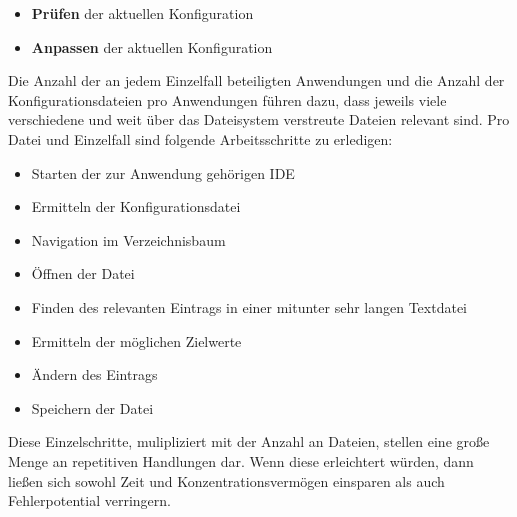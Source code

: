 \begin{itemize}
    \item \textbf{Prüfen} der aktuellen Konfiguration
    \item \textbf{Anpassen} der aktuellen Konfiguration
\end{itemize}

Die Anzahl der an jedem Einzelfall beteiligten Anwendungen und die Anzahl der
Konfigurationsdateien pro Anwendungen führen dazu, dass jeweils viele verschiedene
und weit über das Dateisystem verstreute Dateien relevant sind. Pro Datei und
Einzelfall sind folgende Arbeitsschritte zu erledigen:

\begin{itemize}
    \item Starten der zur Anwendung gehörigen \gls{IDE}
    \item Ermitteln der Konfigurationsdatei
    \item Navigation im Verzeichnisbaum
    \item Öffnen der Datei
    \item Finden des relevanten Eintrags in einer mitunter sehr langen Textdatei
    \item Ermitteln der möglichen Zielwerte
    \item Ändern des Eintrags
    \item Speichern der Datei
\end{itemize}

Diese Einzelschritte, mulipliziert mit der Anzahl an Dateien, stellen eine
große Menge an repetitiven Handlungen dar. Wenn diese erleichtert würden, dann
ließen sich sowohl Zeit und Konzentrationsvermögen einsparen als auch Fehlerpotential
verringern.
